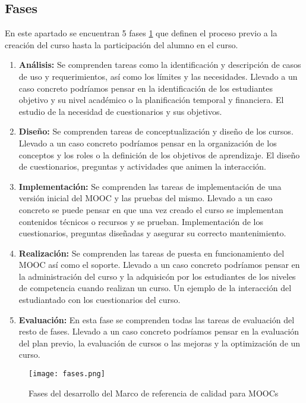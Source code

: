 \subsection{Fases}
En este apartado se encuentran 5 fases \ref{fig:fases-calidad} que definen el proceso previo a la creación del curso hasta la participación del alumno en el curso.
\begin{enumerate}
    \item \textbf{Análisis:} Se comprenden tareas como la identificación y descripción de casos de uso y requerimientos, así como los límites y las necesidades. Llevado a un caso concreto podríamos pensar en la identificación de los estudiantes objetivo y su nivel académico o la planificación temporal y financiera. El estudio de la necesidad de cuestionarios y sus objetivos.
    \item \textbf{Diseño:} Se comprenden tareas de conceptualización y diseño de los cursos. Llevado a un caso concreto podríamos pensar en la organización de los conceptos y los roles o la definición de los objetivos de aprendizaje. El diseño de cuestionarios, preguntas y actividades que animen la interacción.
    \item \textbf{Implementación:} Se comprenden las tareas de implementación de una versión inicial del MOOC y las pruebas del mismo. Llevado a un caso concreto se puede pensar en que una vez creado el curso se implementan contenidos técnicos o recursos y se prueban. Implementación de los cuestionarios,  preguntas diseñadas y asegurar su correcto mantenimiento.
    \item \textbf{Realización:} Se comprenden las tareas de puesta en funcionamiento del MOOC así como el soporte. Llevado a un caso concreto podríamos pensar en la administración del curso y la adquisicón por los estudiantes de los niveles de competencia cuando realizan un curso. Un ejemplo de la interacción del estudiantado con los cuestionarios del curso.
    \item \textbf{Evaluación:} En esta fase se comprenden todas las tareas de evaluación del resto de fases. Llevado a un caso concreto podríamos pensar en la evaluación del plan previo, la evaluación  de cursos o las mejoras y la optimización de un curso.
    
\end{enumerate}

\begin{figure}[H]
    \centering
    \texttt{[image: fases.png]}
    \caption{Fases del desarrollo del Marco de referencia de calidad para MOOCs}
    \label{fig:fases-calidad}
\end{figure}

